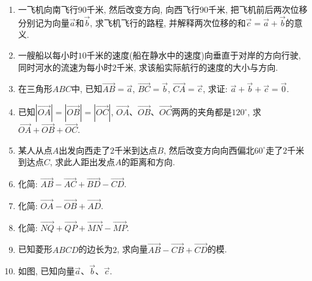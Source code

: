 \documentclass[10pt,a4paper]{article}
\begin{document}
\begin{enumerate}[1.]
(1) $\overrightarrow a+\overrightarrow a$;
(2) $\overrightarrow a+\overrightarrow c$;\\
(3) $\overrightarrow b+\overrightarrow a+\overrightarrow d$;\\
(4) $\overrightarrow c+\overrightarrow b+\overrightarrow c$.
\item 一飞机向南飞行$90$千米, 然后改变方向, 向西飞行$90$千米, 把飞机前后两次位移分别记为向量$\overrightarrow a$和$\overrightarrow b$, 求飞机飞行的路程, 并解释两次位移的和$\overrightarrow c=\overrightarrow a+\overrightarrow b$的意义.
\item 一艘船以每小时$10$千米的速度(船在静水中的速度)向垂直于对岸的方向行驶, 同时河水的流速为每小时$2$千米, 求该船实际航行的速度的大小与方向.
\item 在三角形$ABC$中, 已知$\overrightarrow{AB}=\overrightarrow a$, $\overrightarrow{BC}=\overrightarrow b$, $\overrightarrow{CA}=\overrightarrow c$, 求证: $\overrightarrow a+\overrightarrow b+\overrightarrow c=\overrightarrow 0$.
\item 已知$|\overrightarrow{OA}|=|\overrightarrow{OB}|=|\overrightarrow{OC}|$, $\overrightarrow{OA}$、$\overrightarrow{OB}$、$\overrightarrow{OC}$两两的夹角都是$120^{\circ }$, 求$\overrightarrow{OA}+\overrightarrow{OB}+\overrightarrow{OC}$.
\item 某人从点$A$出发向西走了$2$千米到达点$B$, 然后改变方向向西偏北$60^{\circ }$走了$2$千米到达点$C$, 求此人距出发点$A$的距离和方向.
\item 化简: $\overrightarrow{AB}-\overrightarrow{AC}+\overrightarrow{BD}-\overrightarrow{CD}$.
\item 化简: $\overrightarrow{OA}-\overrightarrow{OB}+\overrightarrow{AD}$.
\item 化简: $\overrightarrow{NQ}+\overrightarrow{QP}+\overrightarrow{MN}-\overrightarrow{MP}$.
\item 已知菱形$ABCD$的边长为$2$, 求向量$\overrightarrow{AB}-\overrightarrow{CB}+\overrightarrow{CD}$的模.
\item 如图, 已知向量$\overrightarrow a$、$\overrightarrow b$、$\overrightarrow c$.\\
\begin{center}

\end{center}
\end{enumerate}
\end{document}
